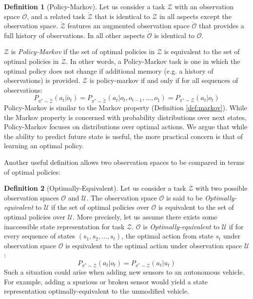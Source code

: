 \documentclass{article} %
\theoremstyle{definition}
\newtheorem{definition}{Definition}[section]
\begin{document}
\begin{definition}[Policy-Markov]
Let us consider a task $\mathcal{Z}$ with an observation space
$\mathcal{O}$, and a related task $\mathring{\mathcal{Z}}$ that is
identical to $\mathcal{Z}$ in all aspects except the observation
space. $\mathring{\mathcal{Z}}$ features an augmented observation
space $\mathring{\mathcal{O}}$ that provides a full history of
observations. In all other aspects $\mathring{\mathcal{O}}$ is
identical to $\mathcal{O}$.

$\mathcal{Z}$ is \textit{Policy-Markov} if the set of optimal policies
in $\mathcal{Z}$ is equivalent to the set of optimal policies in
$\mathring{\mathcal{Z}}$. In other words, a Policy-Markov task is one
in which the optimal policy does not change if additional memory
(e.g. a history of observations) is provided. $\mathcal{Z}$ is
policy-markov if and only if for all sequences of observations:
\[
P_{\pi^* \sim \mathring{\mathcal{Z}}}(a_t | \mathring{o_{t}}) = P_{\pi^* \sim \mathring{\mathcal{Z}}}(a_t | o_{t}, o_{t-1}, \dots, o_{1}) = P_{\pi^* \sim \mathcal{Z}}(a_t | o_{t})
\]
Policy-Markov is similar to the Markov property (Definition
\ref{def:markov}). While the Markov property is concerned with
probability distributions over next states, Policy-Markov focuses on
distributions over optimal actions. We argue that while the ability to
predict future state is useful, the more practical concern is that of
learning an optimal policy.
\end{definition}

Another useful definition allows two observation spaces to be compared
in terms of optimal policies:

\begin{definition}[Optimally-Equivalent]
\label{def:opt-equiv}
Let us consider a task $\mathcal{Z}$ with two possible observation
spaces $\mathcal{O}$ and $\mathcal{U}$. The observation space
$\mathcal{O}$ is said to be \textit{Optimally-equivalent} to
$\mathcal{U}$ if the set of optimal policies over $\mathcal{O}$ is
equivalent to the set of optimal policies over $\mathcal{U}$. More
precisely, let us assume there exists some inaccessible state
representation for task $\mathcal{Z}$. $\mathcal{O}$ is
\textit{Optimally-equivalent} to $\mathcal{U}$ if for every sequence
of states $(s_1, s_2, \dots, s_t)$, the optimal action from state
$s_t$ under observation space $\mathcal{O}$ is equivalent to the
optimal action under observation space $\mathcal{U}$:
\[
P_{\pi^* \sim \mathcal{Z}}(a_t | o_{t}) = P_{\pi^* \sim {\mathcal{Z}}}(a_t | u_{t})
\]
Such a situation could arise when adding new sensors to an autonomous
vehicle. For example, adding a spurious or broken sensor would yield a
state representation optimally-equivalent to the unmodified vehicle.
\end{definition}
\end{document}
